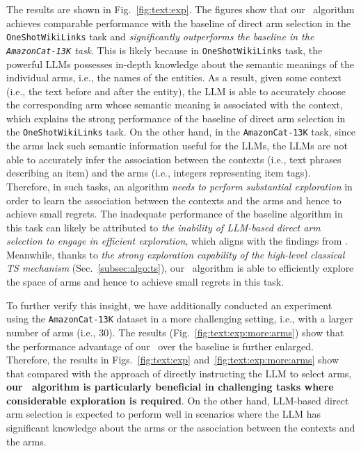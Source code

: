 The results are shown in Fig.~\ref{fig:text:exp}.
The figures show that our \algts~algorithm achieves comparable performance with the baseline of direct arm selection in the \texttt{OneShotWikiLinks} task and \emph{significantly outperforms the baseline in the \texttt{AmazonCat-13K} task}.
This is likely because in \texttt{OneShotWikiLinks} task, the powerful LLMs possesses in-depth knowledge about the semantic meanings of the individual arms, i.e., the names of the entities.
As a result, given some context (i.e., the text before and after the entity), the LLM is able to accurately choose the corresponding arm whose semantic meaning is associated with the context, which explains the strong performance of the baseline of direct arm selection in the \texttt{OneShotWikiLinks} task.
On the other hand, in the \texttt{AmazonCat-13K} task, since the arms lack such semantic information useful for the LLMs, the LLMs are not able to accurately infer the association between the contexts (i.e., text phrases describing an item) and the arms (i.e., integers representing item tags).
Therefore, in such tasks, an algorithm \emph{needs to perform substantial exploration} in order to learn the association between the contexts and the arms and hence to achieve small regrets.
The inadequate performance of the baseline algorithm in this task can likely be attributed to \emph{the inability of LLM-based direct arm selection to engage in efficient exploration}, which aligns with the findings from \citet{krishnamurthy2024can}.
Meanwhile, thanks to \emph{the strong exploration capability of the high-level classical TS mechanism} (Sec.~\ref{subsec:algo:ts}), our \algts~algorithm is able to efficiently explore the space of arms and hence to achieve small regrets in this task.

To further verify this insight, we have additionally conducted an experiment using the \texttt{AmazonCat-13K} dataset in a more challenging setting, i.e., with a larger number of arms (i.e., $30$).
The results (Fig.~\ref{fig:text:exp:more:arms}) show that the performance advantage of our \algts~over the baseline is further enlarged.
Therefore, the results in Figs.~\ref{fig:text:exp} and~\ref{fig:text:exp:more:arms} show that compared with the approach of directly instructing the LLM to select arms, \textbf{our \algts~algorithm is particularly beneficial in challenging tasks where considerable exploration is required}.
On the other hand, LLM-based direct arm selection is expected to perform well in scenarios where the LLM has significant knowledge about the arms or the association between the contexts and the arms.




